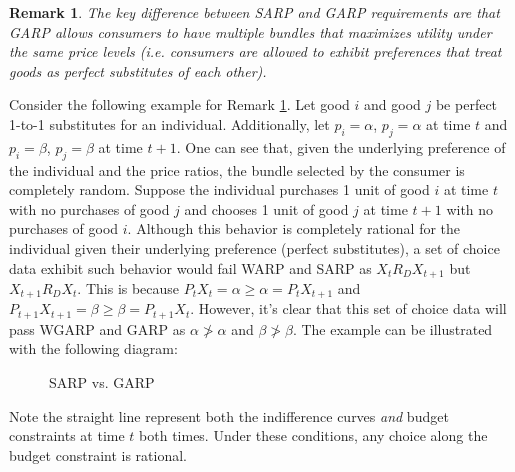 \documentclass{article} %
\theoremstyle{style1}
\newtheorem{remark}{Remark}
\theoremstyle{style1}
\theoremstyle{example}
\begin{document}
\begin{remark}
\label{rmk:Remark 3}
The key difference between SARP and GARP requirements are that GARP allows consumers to have multiple bundles that maximizes utility under the same price levels (i.e. consumers are allowed to exhibit preferences that treat goods as perfect substitutes of each other).
\end{remark}
Consider the following example for Remark \ref{rmk:Remark 3}. Let good $i$ and good $j$ be perfect 1-to-1 substitutes for an individual. Additionally, let $p_i=\alpha$, $p_j=\alpha$ at time $t$ and $p_i=\beta$, $p_j=\beta$ at time $t+1$. One can see that, given the underlying preference of the individual and the price ratios, the bundle selected by the consumer is completely random. Suppose the individual purchases 1 unit of good $i$ at time $t$ with no purchases of good $j$ and chooses 1 unit of good $j$ at time $t+1$ with no purchases of good $i$. Although this behavior is completely rational for the individual given their underlying preference (perfect substitutes), a set of choice data exhibit such behavior would fail WARP and SARP as $X_{t} R_D X_{t+1}$ but $X_{t+1} R_D X_{t}$. This is because $P_tX_t=\alpha\geq\alpha=P_tX_{t+1}$ and $P_{t+1}X_{t+1}=\beta\geq\beta=P_{t+1}X_t$. However, it's clear that this set of choice data will pass WGARP and GARP as $\alpha\not>\alpha$ and $\beta\not>\beta$. The example can be illustrated with the following diagram:
\begin{figure}[H]
\centering
{}
\caption{SARP vs. GARP} \label{fig:SARPvsGARP}
\end{figure}
\noindent
Note the straight line represent both the indifference curves \emph{and} budget constraints at time $t$ both times. Under these conditions, any choice along the budget constraint is rational. 
\end{document}
